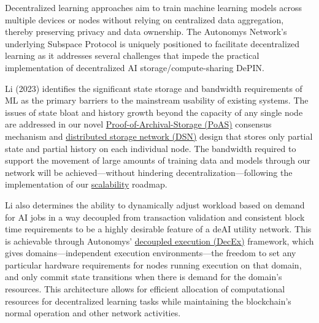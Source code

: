 \documentclass[conference]{IEEEtran}
\begin{document}
Decentralized learning approaches aim to train machine learning models across multiple devices or nodes without relying on centralized data aggregation, thereby preserving privacy and data ownership. The Autonomys Network's underlying Subspace Protocol is uniquely positioned to facilitate decentralized learning as it addresses several challenges that impede the practical implementation of decentralized AI storage/compute-sharing DePIN.

Li (2023)\cite{li2023} identifies the significant state storage and bandwidth requirements of ML as the primary barriers to the mainstream usability of existing systems. The issues of state bloat and history growth beyond the capacity of any single node are addressed in our novel \hyperref[sec:poas]{Proof-of-Archival-Storage (PoAS)} consensus mechanism and \hyperref[sec:dsn]{distributed storage network (DSN)} design that stores only partial state and partial history on each individual node. The bandwidth required to support the movement of large amounts of training data and models through our network will be achieved—without hindering decentralization—following the implementation of our \hyperref[sec:scalability]{scalability} roadmap.

Li also determines the ability to dynamically adjust workload based on demand for AI jobs in a way decoupled from transaction validation and consistent block time requirements to be a highly desirable feature of a deAI utility network. This is achievable through Autonomys' \hyperref[sec:decex]{decoupled execution (DecEx)} framework, which gives domains—independent execution environments—the freedom to set any particular hardware requirements for nodes running execution on that domain, and only commit state transitions when there is demand for the domain's resources. This architecture allows for efficient allocation of computational resources for decentralized learning tasks while maintaining the blockchain's normal operation and other network activities.
\end{document}
